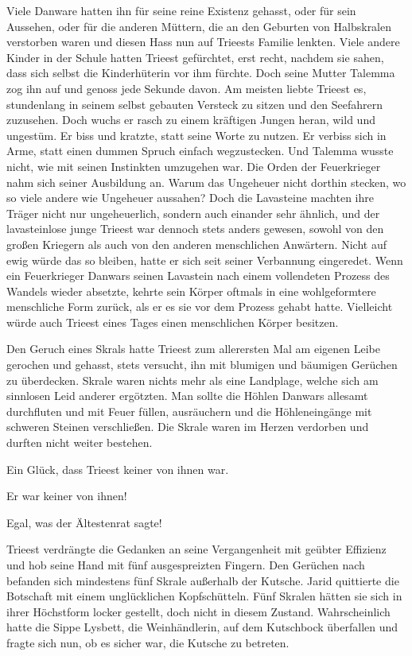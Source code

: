Viele Danware hatten ihn für seine reine Existenz gehasst, oder für sein Aussehen, oder für die anderen Müttern, die an den Geburten von Halbskralen verstorben waren und diesen Hass nun auf Trieests Familie lenkten. Viele andere Kinder in der Schule hatten Trieest gefürchtet, erst recht, nachdem sie sahen, dass sich selbst die Kinderhüterin vor ihm fürchte. Doch seine Mutter Talemma zog ihn auf und genoss jede Sekunde davon. Am meisten liebte Trieest es, stundenlang in seinem selbst gebauten Versteck zu sitzen und den Seefahrern zuzusehen. Doch wuchs er rasch zu einem kräftigen Jungen heran, wild und ungestüm. Er biss und kratzte, statt seine Worte zu nutzen. Er verbiss sich in Arme, statt einen dummen Spruch einfach wegzustecken. Und Talemma wusste nicht, wie mit seinen Instinkten umzugehen war. Die Orden der Feuerkrieger nahm sich seiner Ausbildung an. Warum das Ungeheuer nicht dorthin stecken, wo so viele andere wie Ungeheuer aussahen? Doch die Lavasteine machten ihre Träger nicht nur ungeheuerlich, sondern auch einander sehr ähnlich, und der lavasteinlose junge Trieest war dennoch stets anders gewesen, sowohl von den großen Kriegern als auch von den anderen menschlichen Anwärtern. Nicht auf ewig würde das so bleiben, hatte er sich seit seiner Verbannung eingeredet. Wenn ein Feuerkrieger Danwars seinen Lavastein nach einem vollendeten Prozess des Wandels wieder absetzte, kehrte sein Körper oftmals in eine wohlgeformtere menschliche Form zurück, als er es sie vor dem Prozess gehabt hatte. Vielleicht würde auch Trieest eines Tages einen menschlichen Körper besitzen.

Den Geruch eines Skrals hatte Trieest zum allerersten Mal am eigenen Leibe gerochen und gehasst, stets versucht, ihn mit blumigen und bäumigen Gerüchen zu überdecken. Skrale waren nichts mehr als eine Landplage, welche sich am sinnlosen Leid anderer ergötzten. Man sollte die Höhlen Danwars allesamt durchfluten und mit Feuer füllen, ausräuchern und die Höhleneingänge mit schweren Steinen verschließen. Die Skrale waren im Herzen verdorben und durften nicht weiter bestehen.

Ein Glück, dass Trieest keiner von ihnen war.

Er war keiner von ihnen!

Egal, was der Ältestenrat sagte!\bigskip







Trieest verdrängte die Gedanken an seine Vergangenheit mit geübter Effizienz und hob seine Hand mit fünf ausgespreizten Fingern. Den Gerüchen nach befanden sich mindestens fünf Skrale außerhalb der Kutsche. Jarid quittierte die Botschaft mit einem unglücklichen Kopfschütteln. Fünf Skralen hätten sie sich in ihrer Höchstform locker gestellt, doch nicht in diesem Zustand. Wahrscheinlich hatte die Sippe Lysbett, die Weinhändlerin, auf dem Kutschbock überfallen und fragte sich nun, ob es sicher war, die Kutsche zu betreten.


